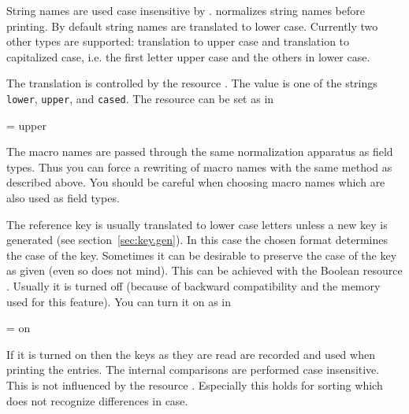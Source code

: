 \documentclass[11pt,a4paper]{scrbook}
\begin{document}
String names are used case insensitive by \BibTeX. \BibTool{} normalizes
string names before printing. By default string names are translated to lower
case.  Currently two other types are supported: translation to upper case and
translation to capitalized case, i.e. the first letter upper case and the
others in lower case.

The translation is controlled by the resource
\label{symbol.type}.  The value is one of the strings
\verb|lower|, \verb|upper|, and \verb|cased|. The resource can be set as in

\begin{Resources}
   = upper
\end{Resources}

The macro names are passed through the same normalization apparatus as field
types. Thus you can force a rewriting of macro names with the same method as
described above. You should be careful when choosing macro names which are
also used as field types.

The reference key is usually translated to lower case letters unless a new key
is generated (see section~\ref{sec:key.gen}). In this case the chosen format
determines the case of the key. Sometimes it can be desirable to preserve the
case of the key as given (even so \BibTeX{} does not mind). This can be
achieved with the Boolean resource . Usually it is
turned off (because of backward compatibility and the memory used for this
feature). You can turn it on as in

\begin{Resources}
   = on
\end{Resources}

If it is turned on then the keys as they are read are recorded and used when
printing the entries. The internal comparisons are performed case insensitive.
This is not influenced by the resource .  Especially
this holds for sorting which does not recognize differences in case.
\end{document}
